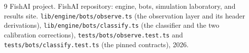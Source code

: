 \documentclass[11pt]{article}
\newcommand{\code}[1]{\texttt{#1}}
\begin{document}
\begin{thebibliography}{9}
FishAI project.
\newblock FishAI repository: engine, bots, simulation laboratory, and results site.
\newblock \code{lib/engine/bots/observe.ts} (the observation layer and its header
derivations), \code{lib/engine/bots/classify.ts} (the classifier and the two calibration
corrections), \code{tests/bots/observe.test.ts} and \code{tests/bots/classify.test.ts} (the
pinned contracts), 2026.

\end{thebibliography}
\end{document}
